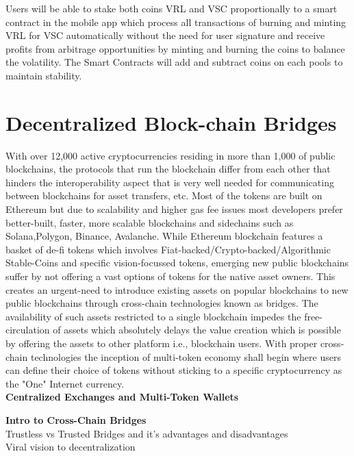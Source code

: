 \documentclass[conference]{IEEEtran}
\begin{document}
Users will be able to stake both coins VRL and VSC proportionally to a smart contract in the mobile app which process all transactions of burning and minting VRL for VSC automatically without the need for user signature and receive profits from arbitrage opportunities by minting and burning the coins to balance the volatility. The Smart Contracts will add and subtract coins on each pools to maintain stability.\\

\section{\textbf{Decentralized Block-chain Bridges}}

With over 12,000 active cryptocurrencies residing in more than 1,000 of public blockchains, the protocols that run the blockchain differ from each other that hinders the interoperability aspect that is very well needed for communicating between blockchains for asset transfers, etc. Most of the tokens are built on Ethereum but due to scalability and higher gas fee issues most developers prefer better-built, faster, more scalable blockchains and sidechains such as Solana,Polygon, Binance, Avalanche. While Ethereum blockchain features a basket of de-fi tokens which involves Fiat-backed/Crypto-backed/Algorithmic Stable-Coins and specific vision-focussed tokens, emerging new public blockchains suffer by not offering a vast options of tokens for the native asset owners. This creates an urgent-need to introduce existing assets on popular blockchains to new public blockchains through cross-chain technologies known as bridges. The availability of such assets restricted to a single blockchain impedes the free-circulation of assets which absolutely delays the value creation which is possible by offering the assets to other platform i.e., blockchain users. With proper cross-chain technologies the inception of multi-token economy shall begin where users can define their choice of tokens without sticking to a specific cryptocurrency as the "One" Internet currency.\\

\textbf{Centralized Exchanges and Multi-Token Wallets}

\textbf{Intro to Cross-Chain Bridges}\\

Trustless vs Trusted Bridges and it's advantages and disadvantages\\

Viral vision to decentralization\\
\end{document}
